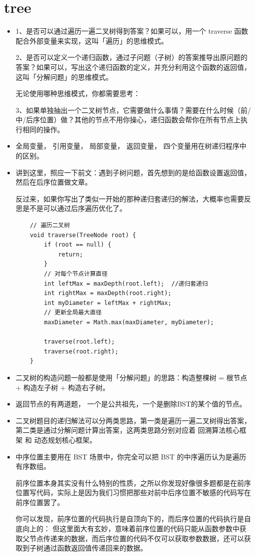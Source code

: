 \documentclass[a4paper,11pt,twoside]{book}
\begin{document}
\section{tree}
\begin{itemize}
	
\item 1、是否可以通过遍历一遍二叉树得到答案？如果可以，用一个 traverse 函数配合外部变量来实现，这叫「遍历」的思维模式。

2、是否可以定义一个递归函数，通过子问题（子树）的答案推导出原问题的答案？如果可以，写出这个递归函数的定义，并充分利用这个函数的返回值，这叫「分解问题」的思维模式。

无论使用哪种思维模式，你都需要思考：

3、如果单独抽出一个二叉树节点，它需要做什么事情？需要在什么时候（前/中/后序位置）做？其他的节点不用你操心，递归函数会帮你在所有节点上执行相同的操作。

\item 全局变量， 引用变量， 局部变量， 返回变量， 四个变量用在树递归程序中的区别。

\item 讲到这里，照应一下前文：遇到子树问题，首先想到的是给函数设置返回值，然后在后序位置做文章。

反过来，如果你写出了类似一开始的那种递归套递归的解法，大概率也需要反思是不是可以通过后序遍历优化了。

\begin{lstlisting}
	// 遍历二叉树
	void traverse(TreeNode root) {
		if (root == null) {
			return;
		}
		// 对每个节点计算直径
		int leftMax = maxDepth(root.left);  //递归套递归
		int rightMax = maxDepth(root.right);
		int myDiameter = leftMax + rightMax;
		// 更新全局最大直径
		maxDiameter = Math.max(maxDiameter, myDiameter);
		
		traverse(root.left);
		traverse(root.right);
	}
\end{lstlisting}

\item 二叉树的构造问题一般都是使用「分解问题」的思路：构造整棵树 = 根节点 + 构造左子树 + 构造右子树。

\item 返回节点的有两道题， 一个是公共祖先，一个是删除BST的某个值的节点。

\item 	二叉树题目的递归解法可以分两类思路，第一类是遍历一遍二叉树得出答案，第二类是通过分解问题计算出答案，这两类思路分别对应着 回溯算法核心框架 和 动态规划核心框架。


\item  中序位置主要用在 BST 场景中，你完全可以把 BST 的中序遍历认为是遍历有序数组。

前序位置本身其实没有什么特别的性质，之所以你发现好像很多题都是在前序位置写代码，实际上是因为我们习惯把那些对前中后序位置不敏感的代码写在前序位置罢了。

你可以发现，前序位置的代码执行是自顶向下的，而后序位置的代码执行是自底向上的： 但这里面大有玄妙，意味着前序位置的代码只能从函数参数中获取父节点传递来的数据，而后序位置的代码不仅可以获取参数数据，还可以获取到子树通过函数返回值传递回来的数据。

	
\end{itemize}
\end{document}
